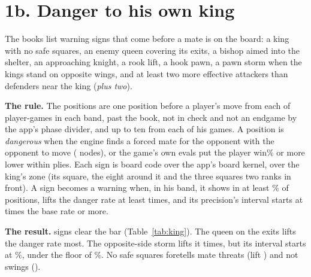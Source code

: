 \documentclass[11pt]{article}
\begin{document}
\section{1b. Danger to his own king}\label{sec:king}

The books list warning signs that come before a mate is on the board: a king with no safe squares,
an enemy queen covering its exits, a bishop aimed into the shelter, an approaching knight, a rook
lift, a hook pawn, a pawn storm when the kings stand on opposite wings, and at least two more
effective attackers than defenders near the king (\emph{plus two}).

\textbf{The rule.} The positions are one position before a player's move from each of \KingHisPositions{}
player-games in each band, past the book, not in check and not an endgame by the app's phase divider,
and up to ten from each of his games. A position is \emph{dangerous} when the engine finds a forced
mate for the opponent with the opponent to move (\CheckNodes{} nodes), or the game's own evals put
the player \SwingWp{} win\% or more lower within \SwingPlies{} plies. Each sign is board code over the app's board kernel,
over the king's zone (its square, the eight around it and the three squares two ranks in front). A
sign becomes a warning when, in his band, it shows in at least \KingShowsBar\% of positions, lifts the
danger rate at least \KingLiftBar{} times, and its precision's interval starts at \KingFloorBar{}
times the base rate or more.

\textbf{The result.} \KingClearedCap{} signs clear the bar (Table~\ref{tab:king}). The queen on the exits
lifts the danger rate most. The opposite-side storm lifts it \KingStormLift{} times, but its interval
starts at \KingStormLow\%, under the floor of \KingFloor\%. No safe squares foretells mate threats
(lift \KingNoSafeMateLift) and not swings (\KingNoSafeSwingLift).

\begin{table}[h]
\centering
\scriptsize\KingTable
\caption{The eight signs in his band's positions (base rate: mate threats \KingHisMateBase\%, swings
\KingHisSwingBase\%), with each sign's lift in the band above and in his games.}
\label{tab:king}
\end{table}
\end{document}
